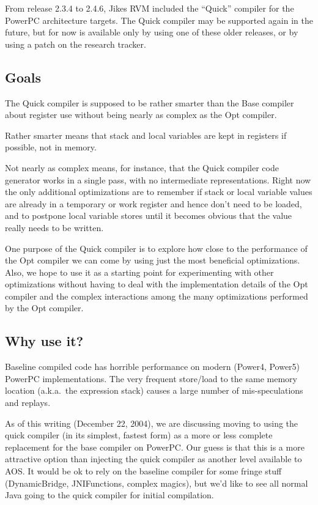 From release 2.3.4 to 2.4.6, Jikes RVM included the ``Quick''
compiler for the PowerPC architecture targets.  The Quick compiler
may be supported again in the future, but for now is available only
by using one of these older releases, or by using a patch on
the research tracker.

\subsection{Goals}

The Quick compiler is supposed to be rather smarter than the Base
compiler about register use without being nearly as complex as the Opt
compiler. 

Rather smarter means that stack and local variables are kept in
registers if possible, not in memory. 

Not nearly as complex means, for instance, that the Quick compiler
code generator works in a single pass, with no intermediate
representations. Right now the only additional optimizations are to
remember if stack or local variable values are already in a temporary
or work register and hence don't need to be loaded, and to postpone
local variable stores until it becomes obvious that the value really
needs to be written. 

One purpose of the Quick compiler is to explore how close to the
performance of the Opt compiler we can come by using just the most
beneficial optimizations. Also, we hope to use it as a starting point
for experimenting with other optimizations without having to deal with
the implementation details of the Opt compiler and the complex
interactions among the many optimizations performed by the Opt
compiler. 

\subsection{Why use it?}

Baseline compiled code has horrible performance on modern (Power4,
Power5) PowerPC implementations.  The very frequent store/load to the
same memory location (a.k.a.\ the expression stack) causes a large number
of mis-speculations and replays. 

As of this writing (December 22, 2004), we are discussing moving to
using the quick compiler (in its simplest, fastest form) as a more or
less complete replacement for the base compiler on PowerPC.  Our guess
is that this is a more attractive option than injecting the quick
compiler as another level available to AOS.  It would be ok to rely on
the baseline compiler for some fringe stuff (DynamicBridge,
JNIFunctions, complex magics), but we'd like to see all normal Java
going to the quick compiler for initial compilation.

